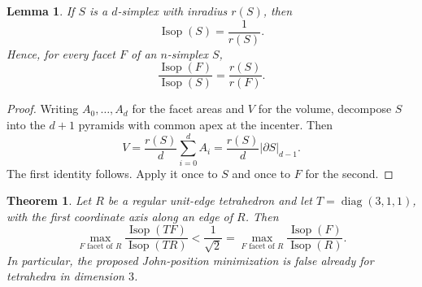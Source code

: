 \documentclass[11pt]{article}
\newtheorem{theorem}{Theorem}
\newtheorem{lemma}{Lemma}
\newcommand{\Isop}{\operatorname{Isop}}
\begin{document}
\begin{lemma}\label{lem:inradius}
If $S$ is a $d$-simplex with inradius $r(S)$, then
\[
 \Isop(S)=\frac{1}{r(S)}.
\]
Hence, for every facet $F$ of an $n$-simplex $S$,
\[
 \frac{\Isop(F)}{\Isop(S)}=\frac{r(S)}{r(F)}.
\]
\end{lemma}

\begin{proof}
Writing $A_0,\ldots,A_d$ for the facet areas and $V$ for the volume,
decompose $S$ into the $d+1$ pyramids with common apex at the incenter.
Then
\[
 V=\frac{r(S)}{d}\sum_{i=0}^d A_i
   =\frac{r(S)}{d}\lvert\partial S\rvert_{d-1}.
\]
The first identity follows.  Apply it once to $S$ and once to $F$ for the
second.
\end{proof}

\begin{theorem}\label{thm:counterexample}
Let $R$ be a regular unit-edge tetrahedron and let
$T=\operatorname{diag}(3,1,1)$, with the first coordinate axis along an edge
of $R$.  Then
\[
 \max_{F\text{ facet of }R}
 \frac{\Isop(TF)}{\Isop(TR)}
 <\frac{1}{\sqrt2}
 =\max_{F\text{ facet of }R}\frac{\Isop(F)}{\Isop(R)}.
\]
In particular, the proposed John-position minimization is false already for
tetrahedra in dimension $3$.
\end{theorem}
\end{document}
